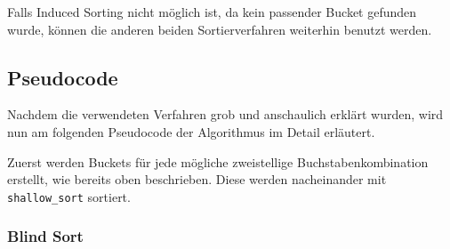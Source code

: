 Falls Induced Sorting nicht möglich ist, da kein passender Bucket gefunden wurde,
können die anderen beiden Sortierverfahren weiterhin benutzt werden.

\subsection{Pseudocode}
Nachdem die verwendeten Verfahren grob und anschaulich erklärt wurden, wird nun am folgenden Pseudocode der Algorithmus im Detail erläutert.

Zuerst werden Buckets für jede mögliche zweistellige Buchstabenkombination erstellt, wie bereits oben beschrieben.
Diese werden nacheinander mit \texttt{shallow\_sort} sortiert.

\subsubsection{Blind Sort}
